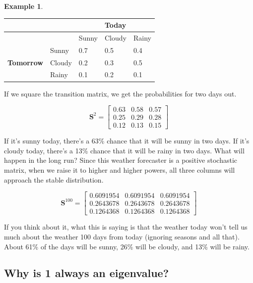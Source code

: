 \documentclass[
]{book}
\theoremstyle{definition}
\theoremstyle{definition}
\newtheorem{example}{Example}[chapter]
\theoremstyle{definition}
\theoremstyle{definition}
\theoremstyle{remark}
\begin{document}
\begin{examplebox}

\begin{example}
\leavevmode

\begin{longtable}[]{@{}lllll@{}}
\toprule\noalign{}
& & & \textbf{Today} & \\
\midrule\noalign{}
\endhead
\bottomrule\noalign{}
\endlastfoot
& & Sunny & Cloudy & Rainy \\
& Sunny & 0.7 & 0.5 & 0.4 \\
\textbf{Tomorrow} & Cloudy & 0.2 & 0.3 & 0.5 \\
& Rainy & 0.1 & 0.2 & 0.1 \\
\end{longtable}

If we square the transition matrix, we get the probabilities for two days out.

\[
\mathbf{S}^2=\begin{bmatrix}
    0.63 & 0.58 & 0.57 \\
    0.25 & 0.29 & 0.28\\
    0.12 & 0.13 & 0.15
    \end{bmatrix}
\]

If it's sunny today, there's a 63\% chance that it will be sunny in two days. If it's cloudy today, there's a 13\% chance that it will be rainy in two days. What will happen in the long run? Since this weather forecaster is a positive stochastic matrix, when we raise it to higher and higher powers, all three columns will approach the stable distribution.

\[
\textbf{S}^{100}=\begin{bmatrix}
    0.6091954 & 0.6091954 & 0.6091954 \\
    0.2643678 & 0.2643678  & 0.2643678\\
    0.1264368 & 0.1264368 & 0.1264368 
    \end{bmatrix}
\]

If you think about it, what this is saying is that the weather today won't tell us much about the weather 100 days from today (ignoring seasons and all that). About 61\% of the days will be sunny, 26\% will be cloudy, and 13\% will be rainy.

\end{example}

\end{examplebox}

\subsection*{Why is 1 always an eigenvalue?}\label{why-is-1-always-an-eigenvalue}
\end{document}
